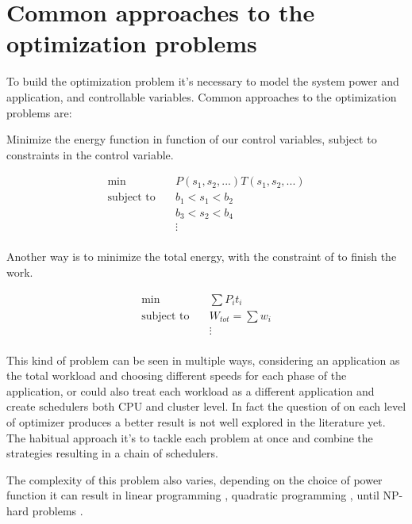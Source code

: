 \section{Common approaches to the optimization problems}

To build the optimization problem it's necessary to model the system power and application, and controllable variables. Common approaches to the optimization problems are:

Minimize the energy function in function of our control variables, subject to constraints in the control variable.

\begin{equation}
\begin{aligned}
\textrm{min} \quad & P(s_1, s_2, ...)T(s_1,s_2,...)\\
\textrm{subject to} \quad & b_1<s_1<b_2\\
\quad & b_3<s_2<b_4\\
\quad & \vdots\\
\end{aligned}
\end{equation}

Another way is to minimize the total energy, with the constraint of to finish the work.

\begin{equation}
\begin{aligned}
\textrm{min} \quad & \sum{P_it_i}\\
\textrm{subject to} \quad & W_{tot} = \sum w_i\\
\quad & \vdots\\
\end{aligned}
\end{equation}

This kind of problem can be seen in multiple ways, considering an application as the total workload and choosing different speeds for each phase of the application, or could also treat each workload as a different application and create schedulers both CPU and cluster level. In fact the question of on each level of optimizer produces a better result is not well explored in the literature yet. The habitual approach it's to tackle each problem at once and combine the strategies resulting in a chain of schedulers.

The complexity of this problem also varies, depending on the choice of power function it can result in linear programming \cite{Kim2015RacingHeuristics}, quadratic programming \cite{Horyath2008Multi-mode}, until NP-hard problems \cite{Fu2018RaceMinimization}.